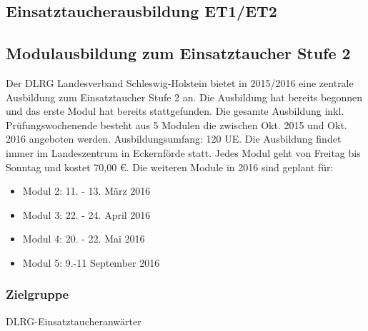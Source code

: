 \documentclass[a4paper,12pt]{book}
\begin{document}



\begin{body}


 
\section*{Einsatztaucherausbildung ET1/ET2}
\subsection*{Modulausbildung zum Einsatztaucher Stufe 2}
Der DLRG Landesverband Schleswig-Holstein bietet in 2015/2016
eine zentrale Ausbildung zum Einsatztaucher Stufe 2 an. Die Ausbildung hat bereits begonnen und das erste Modul hat bereits stattgefunden. Die gesamte Ausbildung 
inkl. Prüfungswochenende besteht aus 5 Modulen die zwischen Okt. 2015 und Okt.
2016 angeboten werden. Ausbildungsumfang: 120 UE. Die
Ausbildung findet immer im Landeszentrum in Eckernförde statt.
Jedes Modul geht von Freitag bis Sonntag und kostet 70,00 €. 
Die weiteren Module in 2016 sind geplant für: 

\begin{itemize}
\item Modul 2: 11. - 13. März 2016 
\item Modul 3: 22. - 24. April 2016 
\item Modul 4: 20. - 22. Mai 2016 
\item Modul 5: 9.-11 September 2016
\end{itemize}
\end{body} 

\begin{targetaudiencediv}
\subsubsection*{Zielgruppe}
DLRG-Einsatztaucheranwärter
\end{targetaudiencediv} 
\end{document}
